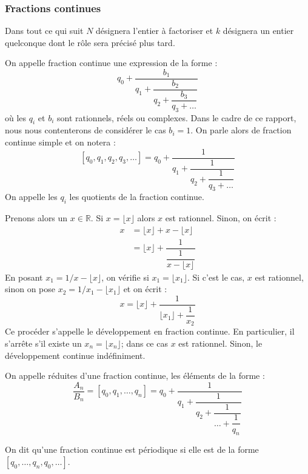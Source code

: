 \documentclass[a4paper]{article} %
\numberwithin{equation}{section}
\begin{document}
\subsubsection{Fractions continues}
Dans tout ce qui suit $N$ désignera l'entier à factoriser et $k$ désignera un entier quelconque dont le rôle sera précisé plus tard.\\\par
\begin{defn}
On appelle fraction continue une expression de la forme :
\[q_0 + \dfrac{b_1}{q_1 + \dfrac{b_2}{q_2 + \dfrac{b_3}{q_3 + \dots }}}\]
où les $q_i$ et $b_i$ sont rationnels, réels ou complexes. Dans le cadre de ce rapport, nous nous contenterons de considérer le cas $b_i = 1$. On parle alors de fraction continue simple et on notera :
\[[q_0, q_1, q_2, q_3, \dots] = q_0 + \dfrac{1}{q_1 + \dfrac{1}{q_2 + \dfrac{1}{q_3 + \dots }}} \]
On appelle les $q_i$ les quotients de la fraction continue.\\
\end{defn}
Prenons alors un $x\in\mathbb{R}$. Si $x = \lfloor{x}\rfloor$ alors $x$ est rationnel. Sinon, on écrit :
\begin{align*}
x &= \lfloor{x}\rfloor + x - \lfloor{x}\rfloor\\
&=\lfloor{x}\rfloor + \dfrac{1}{\dfrac{1}{x - \lfloor{x}\rfloor}}
\end{align*}
En posant $x_1 = 1/x - \lfloor{x}\rfloor$, on vérifie si $x_1 = \lfloor{x_1}\rfloor$. Si c'est le cas, $x$ est rationnel, sinon on pose $x_2 = 1/x_1 - \lfloor{x_1}\rfloor$ et on écrit :
\[x = \lfloor{x}\rfloor + \dfrac{1}{\lfloor{x_1}\rfloor + \dfrac{1}{x_2}}\]
Ce procéder s'appelle le développement en fraction continue. En particulier, il s'arrête s'il existe un $x_n = \lfloor{x_n}\rfloor$; dans ce cas $x$ est rationnel. Sinon, le développement continue indéfiniment.\\\par
\begin{defn}
On appelle réduites d'une fraction continue, les éléments de la forme : 
\[\dfrac{A_n}{B_n} = [q_0, q_1,\dots, q_n] = q_0 + \dfrac{1}{q_1 + \dfrac{1}{q_2 + \dfrac{1}{\dots+\dfrac{1}{q_n}}}}\]
\end{defn}
\begin{defn}
On dit qu'une fraction continue est périodique si elle est de la forme $[q_0,\dots,q_n,q_0,\dots]$.
\end{defn}
\end{document}
